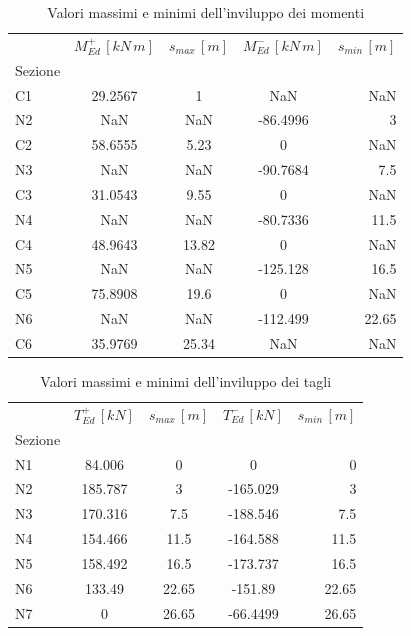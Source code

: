 \begin{table}
  	\centering
  	\caption{Valori massimi e minimi dell'inviluppo dei momenti}
  	\label{tab:max_min_bendingMomentEnvelope_sleQP}
  	\begin{tabular}{lcccr}
		\toprule
		& $M_{Ed}^+\,[kN\,m]$ & $s_{max}\,[m]$ & $M_{Ed}^-\,[kN\,m]$ & $s_{min}\,[m]$ \\
		Sezione &             &          &             &          \\
\midrule
C1      &     29.2567 &        1 &         NaN &      NaN \\
N2      &         NaN &      NaN &    -86.4996 &        3 \\
C2      &     58.6555 &     5.23 &           0 &      NaN \\
N3      &         NaN &      NaN &    -90.7684 &      7.5 \\
C3      &     31.0543 &     9.55 &           0 &      NaN \\
N4      &         NaN &      NaN &    -80.7336 &     11.5 \\
C4      &     48.9643 &    13.82 &           0 &      NaN \\
N5      &         NaN &      NaN &    -125.128 &     16.5 \\
C5      &     75.8908 &     19.6 &           0 &      NaN \\
N6      &         NaN &      NaN &    -112.499 &    22.65 \\
C6      &     35.9769 &    25.34 &         NaN &      NaN \\
\bottomrule
	\end{tabular}
  \end{table}
  
\begin{table}
  	\centering
  	\caption{Valori massimi e minimi dell'inviluppo dei tagli}
  	\label{tab:shearEnvelope_sleQP}
  	\begin{tabular}{lcccr}
		\toprule
		& $T_{Ed}^+\,[kN]$ & $s_{max}\,[m]$ & $T_{Ed}^-\,[kN]$ & $s_{min}\,[m]$ \\
		Sezione &             &          &             &          \\
		\midrule
N1      &    84.006 &        0 &         0 &        0 \\
N2      &   185.787 &        3 &  -165.029 &        3 \\
N3      &   170.316 &      7.5 &  -188.546 &      7.5 \\
N4      &   154.466 &     11.5 &  -164.588 &     11.5 \\
N5      &   158.492 &     16.5 &  -173.737 &     16.5 \\
N6      &    133.49 &    22.65 &   -151.89 &    22.65 \\
N7      &         0 &    26.65 &  -66.4499 &    26.65 \\
		\bottomrule
	\end{tabular}
  \end{table}

